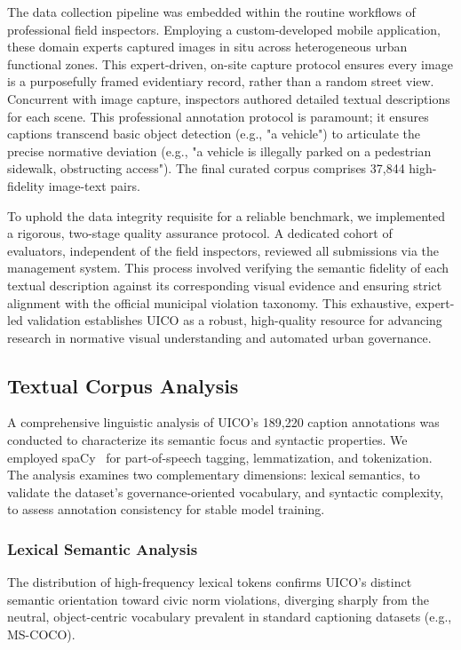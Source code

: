 \documentclass[lettersize,journal]{IEEEtran}
\begin{document}
	The data collection pipeline was embedded within the routine workflows of professional field inspectors. Employing a custom-developed mobile application, these domain experts captured images in situ across heterogeneous urban functional zones. This expert-driven, on-site capture protocol ensures every image is a purposefully framed evidentiary record, rather than a random street view. Concurrent with image capture, inspectors authored detailed textual descriptions for each scene. This professional annotation protocol is paramount; it ensures captions transcend basic object detection (e.g., "a vehicle") to articulate the precise normative deviation (e.g., "a vehicle is illegally parked on a pedestrian sidewalk, obstructing access"). The final curated corpus comprises 37,844 high-fidelity image-text pairs.
	
	To uphold the data integrity requisite for a reliable benchmark, we implemented a rigorous, two-stage quality assurance protocol. A dedicated cohort of evaluators, independent of the field inspectors, reviewed all submissions via the management system. This process involved verifying the semantic fidelity of each textual description against its corresponding visual evidence and ensuring strict alignment with the official municipal violation taxonomy. This exhaustive, expert-led validation establishes UICO as a robust, high-quality resource for advancing research in normative visual understanding and automated urban governance.
	
	\subsection{Textual Corpus Analysis}
	
	A comprehensive linguistic analysis of UICO's 189,220 caption annotations was conducted to characterize its semantic focus and syntactic properties. We employed spaCy~\cite{honnibal2020spacy} for part-of-speech tagging, lemmatization, and tokenization. The analysis examines two complementary dimensions: lexical semantics, to validate the dataset's governance-oriented vocabulary, and syntactic complexity, to assess annotation consistency for stable model training.
	
	\subsubsection{Lexical Semantic Analysis}
	The distribution of high-frequency lexical tokens confirms UICO's distinct semantic orientation toward civic norm violations, diverging sharply from the neutral, object-centric vocabulary prevalent in standard captioning datasets (e.g., MS-COCO).
	
\end{document}

